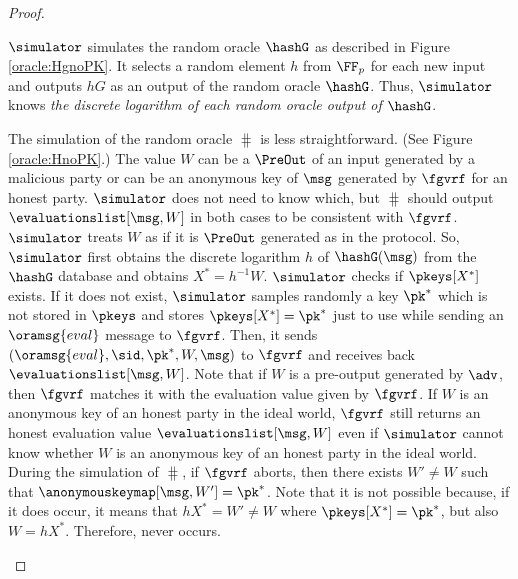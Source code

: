 \begin{proof}
\begin{itemize}
		$ \simulator $ simulates the random oracle $ \hashG $ as described in Figure \ref{oracle:HgnoPK}. It selects a random element  $ h $ from $ \FF_p $ for each new input and outputs $ hG $ as an output of the random oracle $ \hashG $. Thus, $ \simulator $ knows \emph{the discrete logarithm of each random oracle output of $\hashG  $}. 
		
		
		The simulation of the random oracle $ \hash $ is less straightforward. (See Figure \ref{oracle:HnoPK}.)
		The value $ W $ can be a $ \PreOut $ of an input generated by a malicious party or can be an anonymous key of  $ \msg $ generated by $ \fgvrf $ for an honest party. $ \simulator $ does not need to know which, but $ \hash $ should output $ \evaluationslist[\msg,W] $ in both cases to be consistent with $ \fgvrf $.	 
		$ \simulator $ treats $ W $ as if it is $ \PreOut $ generated as in the protocol. So, $ \simulator $ first obtains the discrete logarithm $ h $ of $ \hashG(\msg) $ from the $ \hashG $ database and obtains $ X^* = h^{-1}W $.    
		$ \simulator $ checks if $ \pkeys[X^*] $ exists. If it does not exist, $ \simulator $ samples randomly a key $ \pk^* $ which is not stored in $ \pkeys $ and stores $ \pkeys[X^*] = \pk^* $ just to use while sending an $ \oramsg{eval} $ message to $ \fgvrf $. Then, it sends  $ (\oramsg{eval}, \sid,\pk^*,W,\msg) $ to $ \fgvrf $ and receives back $ \evaluationslist[\msg,W] $.
		Note that if $ W $ is a pre-output generated by $ \adv $, then $ \fgvrf $ matches it with the evaluation value given by $ \fgvrf $. If $ W $ is an anonymous key of an honest party in the ideal world, $ \fgvrf $ still returns an honest evaluation value $ \evaluationslist[\msg,W] $ even if $ \simulator $ cannot know whether $ W $ is an anonymous key of an honest party in the ideal world. 
		During the simulation of $ \hash $, if $ \fgvrf $ aborts, then there exists $ W' \neq W $ such that $ \anonymouskeymap[\msg,W'] = \pk^* $. Note that it is not possible because, if it does occur, it means that $ hX^* = W' \neq W  $ where $ \pkeys[X^*] = \pk^* $, but also $ W = hX^* $. 
		Therefore,  never occurs.
		

\end{itemize}
\end{proof}
